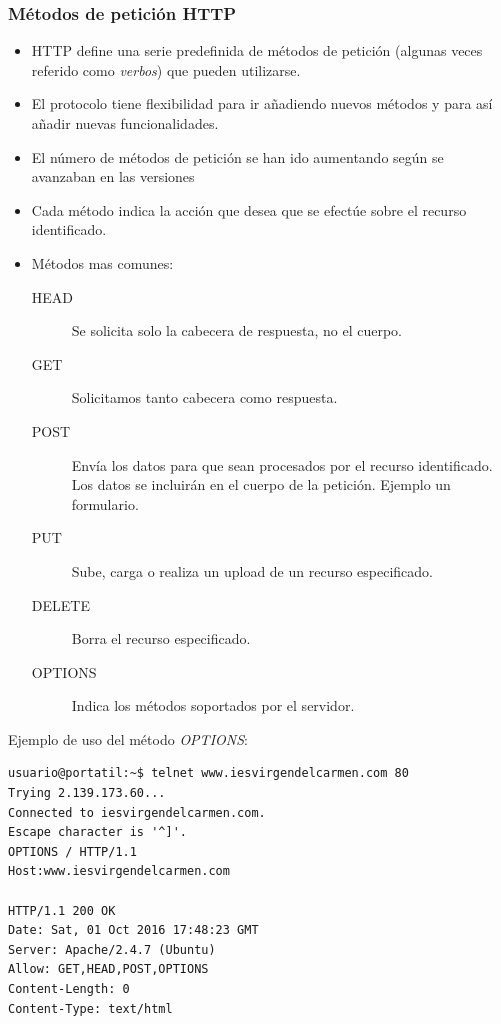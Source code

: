 \documentclass[4paper]{article}
\newcommand{\HT}{HTTP}
\begin{document}
\subsubsection{Métodos de petición \HT}
\begin{itemize}
\item HTTP define una serie predefinida de métodos de petición (algunas veces referido como \emph{verbos}) que pueden utilizarse.
\item El protocolo tiene flexibilidad para ir añadiendo nuevos métodos y para así añadir nuevas funcionalidades. 
\item El número de métodos de petición se han ido aumentando según se avanzaban en las versiones
\item Cada método indica la acción que desea que se efectúe sobre el recurso identificado.
\item Métodos mas comunes:
\begin{description}
\item[HEAD] Se solicita solo la cabecera de respuesta, no el cuerpo.
\item[GET] Solicitamos tanto cabecera como respuesta.
\item[POST] Envía los datos para que sean procesados por el recurso identificado. Los datos se incluirán en el cuerpo de la petición. Ejemplo un formulario.
\item[PUT] Sube, carga o realiza un upload de un recurso especificado.
\item[DELETE] Borra el recurso especificado.
\item[OPTIONS] Indica los métodos soportados por el servidor.
\end{description}
\end{itemize}
Ejemplo de uso del método \emph{OPTIONS}:
\begin{verbatim}
usuario@portatil:~$ telnet www.iesvirgendelcarmen.com 80
Trying 2.139.173.60...
Connected to iesvirgendelcarmen.com.
Escape character is '^]'.
OPTIONS / HTTP/1.1
Host:www.iesvirgendelcarmen.com

HTTP/1.1 200 OK
Date: Sat, 01 Oct 2016 17:48:23 GMT
Server: Apache/2.4.7 (Ubuntu)
Allow: GET,HEAD,POST,OPTIONS
Content-Length: 0
Content-Type: text/html
\end{verbatim}
\end{document}
